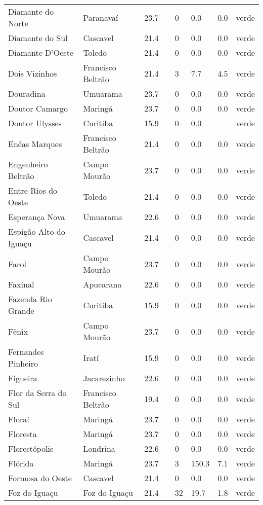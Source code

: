 \begin{longtable}{l|lllllll}
  Diamante do Norte & Paranavaí & 23.7 &  & 0 & 0.0 & 0.0 & verde \\ 
  Diamante do Sul & Cascavel & 21.4 &  & 0 & 0.0 & 0.0 & verde \\ 
  Diamante D'Oeste & Toledo & 21.4 &  & 0 & 0.0 & 0.0 & verde \\ 
  Dois Vizinhos & Francisco Beltrão & 21.4 &  & 3 & 7.7 & 4.5 & verde \\ 
  Douradina & Umuarama & 23.7 &  & 0 & 0.0 & 0.0 & verde \\ 
  Doutor Camargo & Maringá & 23.7 &  & 0 & 0.0 & 0.0 & verde \\ 
  Doutor Ulysses & Curitiba & 15.9 &  & 0 & 0.0 &  & verde \\ 
  Enéas Marques & Francisco Beltrão & 21.4 &  & 0 & 0.0 & 0.0 & verde \\ 
  Engenheiro Beltrão & Campo Mourão & 23.7 &  & 0 & 0.0 & 0.0 & verde \\ 
  Entre Rios do Oeste & Toledo & 21.4 &  & 0 & 0.0 & 0.0 & verde \\ 
  Esperança Nova & Umuarama & 22.6 &  & 0 & 0.0 & 0.0 & verde \\ 
  Espigão Alto do Iguaçu & Cascavel & 21.4 &  & 0 & 0.0 & 0.0 & verde \\ 
  Farol & Campo Mourão & 23.7 &  & 0 & 0.0 & 0.0 & verde \\ 
  Faxinal & Apucarana & 22.6 &  & 0 & 0.0 & 0.0 & verde \\ 
  Fazenda Rio Grande & Curitiba & 15.9 &  & 0 & 0.0 & 0.0 & verde \\ 
  Fênix & Campo Mourão & 23.7 &  & 0 & 0.0 & 0.0 & verde \\ 
  Fernandes Pinheiro & Iratí & 15.9 &  & 0 & 0.0 & 0.0 & verde \\ 
  Figueira & Jacarezinho & 22.6 &  & 0 & 0.0 & 0.0 & verde \\ 
  Flor da Serra do Sul & Francisco Beltrão & 19.4 &  & 0 & 0.0 & 0.0 & verde \\ 
  Floraí & Maringá & 23.7 &  & 0 & 0.0 & 0.0 & verde \\ 
  Floresta & Maringá & 23.7 &  & 0 & 0.0 & 0.0 & verde \\ 
  Florestópolis & Londrina & 22.6 &  & 0 & 0.0 & 0.0 & verde \\ 
  Flórida & Maringá & 23.7 &  & 3 & 150.3 & 7.1 & verde \\ 
  Formosa do Oeste & Cascavel & 21.4 &  & 0 & 0.0 & 0.0 & verde \\ 
  Foz do Iguaçu & Foz do Iguaçu & 21.4 &  & 32 & 19.7 & 1.8 & verde \\ 

\end{longtable}
